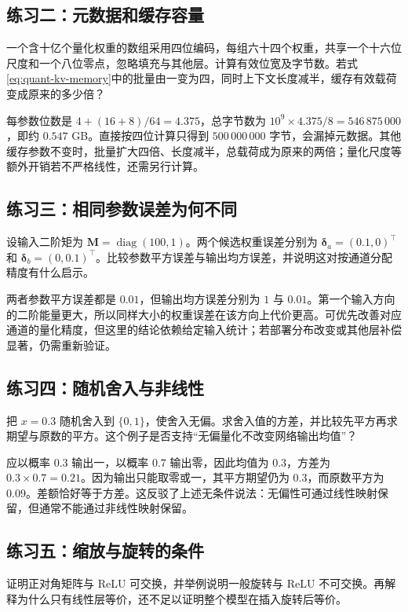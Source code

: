 \documentclass[UTF8,12pt,a4paper,fontset=fandol]{ctexart}
\begin{document}
\subsection{练习二：元数据和缓存容量}
一个含十亿个量化权重的数组采用四位编码，每组六十四个权重，共享一个十六位尺度和一个八位零点，忽略填充与其他层。计算有效位宽及字节数。若式\eqref{eq:quant-kv-memory}中的批量由一变为四，同时上下文长度减半，缓存有效载荷变成原来的多少倍？

\begin{solve}
每参数位数是 $4+(16+8)/64=4.375$，总字节数为 $10^9\times4.375/8=546\,875\,000$，即约 $0.547$ GB。直接按四位计算只得到 $500\,000\,000$ 字节，会漏掉元数据。其他缓存参数不变时，批量扩大四倍、长度减半，总载荷成为原来的两倍；量化尺度等额外开销若不严格线性，还需另行计算。
\end{solve}

\subsection{练习三：相同参数误差为何不同}
设输入二阶矩为 $\mathbf M=\operatorname{diag}(100,1)$。两个候选权重误差分别为 $\boldsymbol\delta_a=(0.1,0)^\top$ 和 $\boldsymbol\delta_b=(0,0.1)^\top$。比较参数平方误差与输出均方误差，并说明这对按通道分配精度有什么启示。

\begin{solve}
两者参数平方误差都是 $0.01$，但输出均方误差分别为 $1$ 与 $0.01$。第一个输入方向的二阶能量更大，所以同样大小的权重误差在该方向上代价更高。可优先改善对应通道的量化精度，但这里的结论依赖给定输入统计；若部署分布改变或其他层补偿显著，仍需重新验证。
\end{solve}

\subsection{练习四：随机舍入与非线性}
把 $x=0.3$ 随机舍入到 $\{0,1\}$，使舍入无偏。求舍入值的方差，并比较先平方再求期望与原数的平方。这个例子是否支持“无偏量化不改变网络输出均值”？

\begin{solve}
应以概率 $0.3$ 输出一，以概率 $0.7$ 输出零，因此均值为 $0.3$，方差为 $0.3\times0.7=0.21$。因为输出只能取零或一，其平方期望仍为 $0.3$，而原数平方为 $0.09$。差额恰好等于方差。这反驳了上述无条件说法：无偏性可通过线性映射保留，但通常不能通过非线性映射保留。
\end{solve}

\subsection{练习五：缩放与旋转的条件}
证明正对角矩阵与 ReLU 可交换，并举例说明一般旋转与 ReLU 不可交换。再解释为什么只有线性层等价，还不足以证明整个模型在插入旋转后等价。
\end{document}
